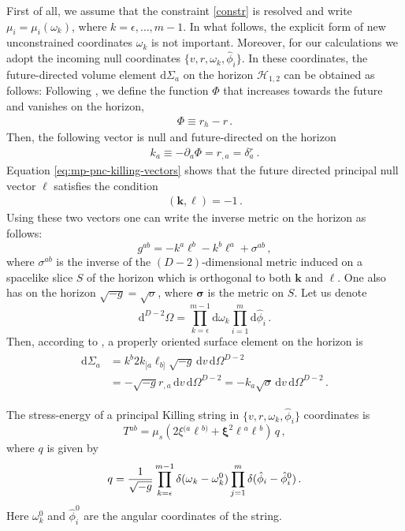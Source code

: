 \documentclass[superscriptaddress,twocolumn,showpacs,
preprintnumbers,amsmath,amssymb,nofootinbib,
longbibliography,aps,prd,10pt]{revtex4-1}
\newcommand{\ts}[1]{{\boldsymbol{#1}}}         %
\newcommand{\dd}{\mbox{d}}
\newcommand{\be}{\begin{equation}}             %
\newcommand{\ee}{\end{equation}}               %
\newcommand{\n}[1]{\label{#1}}
\begin{document}
First of all, we assume that the constraint \eqref{constr} is resolved and write $\mu_i=\mu_i(\omega_k)$, where $k=\epsilon,\ldots,m-1$. In what follows, the explicit form of new unconstrained coordinates $\omega_k$ is not important. Moreover, for our calculations we adopt the incoming null coordinates $\{v,r,\omega_k,\hat{\phi}_i\}$.
In these coordinates, the future-directed volume element $\dd \Sigma_a$ on the horizon $\mathcal{H}_{1,2}$ can be obtained as follows: Following \cite{Poisson:2004}, we define the function $\Phi$ that increases towards the future and vanishes on the horizon,
\begin{align}
\Phi \equiv r_h - r \, .
\end{align}
Then, the following vector is  null and future-directed on the horizon
\begin{align}
k_a \equiv -\partial_a \Phi = r_{,a} = \delta{}^r_a \ .
\end{align}
Equation \eqref{eq:mp-pnc-killing-vectors} shows that the future directed  principal null vector $\ts{\ell}$ satisfies the condition
\begin{align}
(\ts{k}, \ts{\ell} ) = -1 \, .
\end{align}
Using these two vectors one can write the inverse metric on the horizon as follows:
\be
g^{ab} = -k^a \ell^b-k^b \ell^a + \sigma^{ab}\, ,
\ee
where $\sigma^{ab}$ is the inverse of the $(D-2)$-dimensional metric induced on a spacelike slice $S$ of the horizon which is orthogonal to both $\ts{k}$ and $\ts{\ell}$. One also has on the horizon $\sqrt{-g}=\sqrt{\sigma}$, where $\ts{\sigma}$ is the metric on $S$. Let us denote
\be
\dd^{D-2}\Omega=\prod\limits_{k=\epsilon}^{m-1} \dd \omega_k \prod\limits_{i=1}^m \dd \hat{\phi}_i\, .
\ee
Then, according to \cite{Poisson:2004}, a properly oriented surface element on the horizon is
\begin{align}
\begin{split}
\label{eq:volume-surface-elements}
\dd \Sigma{}_a &= k^b 2 k_{[a} \ell_{b]} \sqrt{-g} \, \dd v \, \dd\Omega^{D-2} \\
&= - \sqrt{-g} r_{,a} \, \dd v \, \dd\Omega^{D-2}=-k_a \sqrt{\sigma} \, \dd v \, \dd\Omega^{D-2}\, .
\end{split}
\end{align}

The stress-energy of a principal Killing string in $\{v,r,\omega_k,\hat{\phi}_i\}$ coordinates is
\be
T{}^{ab} = \mu_s \left( 2\xi{}^{(a} \ell{}^{b)} + \ts{\xi}^2 \ell{}^a \ell{}^b \right ) \, q \, , \label{eq:stress-energy}
\ee
where $q$ is given by
\be\n{qqq}
q={1\over \sqrt{-g}} \prod\limits_{k=\epsilon}^{m-1} \delta( \omega{}_k -\omega{}_k^0) \prod\limits_{j=1}^m \delta(\hat{\phi}_i-\hat{\phi}_i^0)\, .
\ee
Here $\omega{}_k^0$ and $\hat{\phi}_i^0$ are the angular coordinates of the string.
\end{document}

